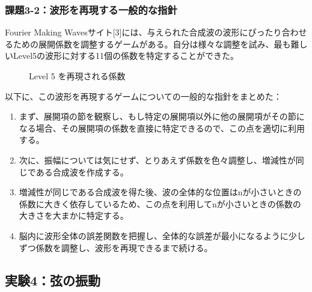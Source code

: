 \documentclass{article}
\begin{document}
\subsubsection{課題3-2：波形を再現する一般的な指針}
\begin{spacing}{1.2}
    Fourier Making Wavesサイト[3]には、与えられた合成波の波形にぴったり合わせるための展開係数を調整するゲームがある。自分は様々な調整を試み、最も難しいLevel5の波形に対する11個の係数を特定することができた。
    \begin{figure}[ht] %
        \centering
        \caption{Level 5 を再現される係数}
    \end{figure}
    \FloatBarrier
    以下に、この波形を再現するゲームについての一般的な指針をまとめた：
    \begin{enumerate}[label=\arabic*), before=\begin{spacing}{1.2}, after=\end{spacing}] %
        \item まず、展開項の節を観察し、もし特定の展開項以外に他の展開項がその節になる場合、その展開項の係数を直接に特定できるので、この点を適切に利用する。
        \item 次に、振幅については気にせず、とりあえず係数を色々調整し、増減性が同じである合成波を作成する。
        \item 増減性が同じである合成波を得た後、波の全体的な位置はnが小さいときの係数に大きく依存しているため、この点を利用してnが小さいときの係数の大きさを大まかに特定する。
        \item 脳内に波形全体の誤差関数を把握し、全体的な誤差が最小になるように少しずつ係数を調整し、波形を再現できるまで続ける。
    \end{enumerate}
\end{spacing}

\newpage
\subsection{実験4：弦の振動}
\end{document}
